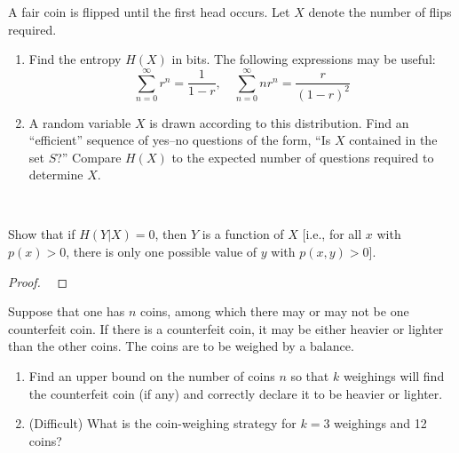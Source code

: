 \begin{exercise}  { A fair coin is flipped until the first head occurs. Let $X$ denote the number of flips required. 
\begin{enumerate}
\item Find the entropy $H(X)$ in bits. The following expressions may be useful:
\begin{equation}
\sum_{n=0}^{\infty} r^{n}=\frac{1}{1-r}, \quad \sum_{n=0}^{\infty} n r^{n}=\frac{r}{(1-r)^{2}}
\end{equation}

\item A random variable $X$ is drawn according to this distribution. Find an “efficient” sequence of yes–no questions of the form, “Is $X$ contained in the set $S$?” Compare $H(X)$ to the expected number of questions required to determine $X$.
\end{enumerate}
}


\begin{solution}
\par{~}
\end{solution}
\end{exercise}

\begin{exercise} {Show that if $H(Y|X) = 0$, then $Y$ is a function of $X$ [i.e., for all $x$ with $p(x) > 0$, there is only one possible value of $y$ with $p(x, y) > 0$].}

\begin{proof}
\par{~}
\end{proof}
\end{exercise}


\begin{exercise} {Suppose that one has $n$ coins, among which there may or may not be one counterfeit coin. If there is a counterfeit coin, it may be either heavier or lighter than the other coins. The coins are to be weighed by a balance.
\begin{enumerate}
\item Find an upper bound on the number of coins $n$ so that $k$ weighings will find the counterfeit coin (if any) and correctly declare it to be heavier or lighter.
\item (Difficult) What is the coin-weighing strategy for $k = 3$ weighings and 12 coins?
\end{enumerate}
}
\begin{solution}
\par{~}
\end{solution}
\end{exercise}